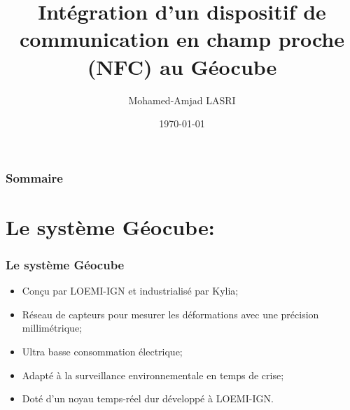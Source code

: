 \documentclass{beamer}
\title[Stage de Fin d'Études]{Intégration d'un dispositif de communication en champ proche (NFC) au Géocube} %
\author{Mohamed-Amjad LASRI} %
\institute[IT3 - GTSI] %
{
École Nationale des Sciences Géographiques \\ %
\medskip
\textit{mohamed-amjad.lasri@ensg.eu} %
}
\date{\today} %
\begin{document}
\begin{frame}
\titlepage %
\end{frame}

\begin{frame}
\frametitle{Sommaire} %
\tableofcontents %
\end{frame}


\section{Le système Géocube:} %
\begin{frame}
\frametitle{Le système Géocube}
\begin{itemize}
\item Conçu par LOEMI-IGN et industrialisé par Kylia;
\item Réseau de capteurs pour mesurer les déformations avec une précision millimétrique;
\item Ultra basse consommation électrique;
\item Adapté à la surveillance environnementale en temps de crise;
\item Doté d'un noyau temps-réel dur développé à LOEMI-IGN.
\end{itemize}
\end{frame}

\end{document}
